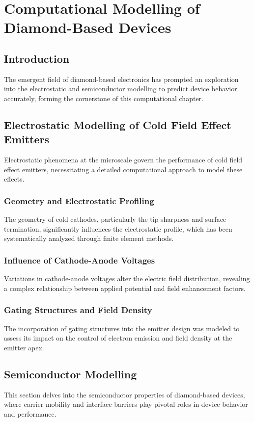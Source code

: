 \chapter{Computational Modelling of Diamond-Based Devices}

\section{Introduction}
The emergent field of diamond-based electronics has prompted an exploration into the electrostatic and semiconductor modelling to predict device behavior accurately, forming the cornerstone of this computational chapter.

\section{Electrostatic Modelling of Cold Field Effect Emitters}
Electrostatic phenomena at the microscale govern the performance of cold field effect emitters, necessitating a detailed computational approach to model these effects.

\subsection{Geometry and Electrostatic Profiling}
The geometry of cold cathodes, particularly the tip sharpness and surface termination, significantly influences the electrostatic profile, which has been systematically analyzed through finite element methods.

\subsection{Influence of Cathode-Anode Voltages}
Variations in cathode-anode voltages alter the electric field distribution, revealing a complex relationship between applied potential and field enhancement factors.

\subsection{Gating Structures and Field Density}
The incorporation of gating structures into the emitter design was modeled to assess its impact on the control of electron emission and field density at the emitter apex.

\section{Semiconductor Modelling}
This section delves into the semiconductor properties of diamond-based devices, where carrier mobility and interface barriers play pivotal roles in device behavior and performance.

